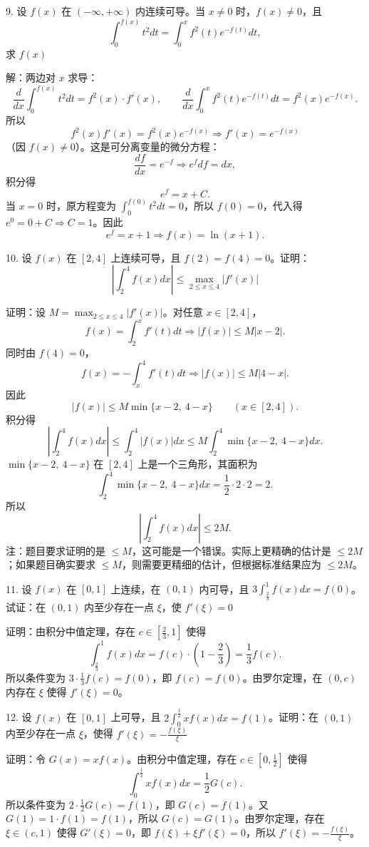9. 设 \(f(x)\) 在 \((-\infty,+\infty)\) 内连续可导。当 \(x\ne0\) 时，\(f(x)\ne0\)，且
\[ \int_{0}^{f(x)}t^{2}dt=\int_{0}^{x}f^{2}(t)e^{-f(t)}dt, \]
求 \(f(x)\)

解：两边对 \(x\) 求导：
\[ \frac{d}{dx}\int_{0}^{f(x)}t^{2}dt=f^{2}(x)\cdot f'(x),\qquad \frac{d}{dx}\int_{0}^{x}f^{2}(t)e^{-f(t)}dt=f^{2}(x)e^{-f(x)}. \]
所以
\[ f^{2}(x)f'(x)=f^{2}(x)e^{-f(x)}\Rightarrow f'(x)=e^{-f(x)} \]
（因 \(f(x)\ne0\)）。这是可分离变量的微分方程：
\[ \frac{df}{dx}=e^{-f}\Rightarrow e^{f}df=dx, \]
积分得
\[ e^{f}=x+C. \]
当 \(x=0\) 时，原方程变为 \(\int_{0}^{f(0)}t^{2}dt=0\)，所以 \(f(0)=0\)，代入得 \(e^{0}=0+C\Rightarrow C=1\)。因此
\[ e^{f}=x+1\Rightarrow f(x)=\ln(x+1). \]

10. 设 \(f(x)\) 在 \([2,4]\) 上连续可导，且 \(f(2)=f(4)=0\)。证明：
\[ \left|\int_{2}^{4}f(x)dx\right|\le\max_{2\le x\le4}|f'(x)| \]

证明：设 \(M=\max_{2\le x\le4}|f'(x)|\)。对任意 \(x\in[2,4]\)，
\[ f(x)=\int_{2}^{x}f'(t)dt\Rightarrow|f(x)|\le M|x-2|. \]
同时由 \(f(4)=0\)，
\[ f(x)=-\int_{x}^{4}f'(t)dt\Rightarrow|f(x)|\le M|4-x|. \]
因此
\[ |f(x)|\le M\min\{x-2,\ 4-x\}\qquad(x\in[2,4]). \]
积分得
\[ \left|\int_{2}^{4}f(x)dx\right|\le\int_{2}^{4}|f(x)|dx\le M\int_{2}^{4}\min\{x-2,\ 4-x\}dx. \]
\(\min\{x-2,\ 4-x\}\) 在 \([2,4]\) 上是一个三角形，其面积为
\[ \int_{2}^{4}\min\{x-2,\ 4-x\}dx=\frac{1}{2}\cdot2\cdot2=2. \]
所以
\[ \left|\int_{2}^{4}f(x)dx\right|\le2M. \]
注：题目要求证明的是 \(\le M\)，这可能是一个错误。实际上更精确的估计是 \(\le2M\)；如果题目确实要求 \(\le M\)，则需要更精细的估计，但根据标准结果应为 \(\le2M\)。

11. 设 \(f(x)\) 在 \([0,1]\) 上连续，在 \((0,1)\) 内可导，且 \(3\int_{\frac{2}{3}}^{1}f(x)dx=f(0)\)。试证：在 \((0,1)\) 内至少存在一点 \(\xi\)，使 \(f'(\xi)=0\)

证明：由积分中值定理，存在 \(c\in\left[\frac{2}{3},1\right]\) 使得
\[ \int_{\frac{2}{3}}^{1}f(x)dx=f(c)\cdot\left(1-\frac{2}{3}\right)=\frac{1}{3}f(c). \]
所以条件变为 \(3\cdot\frac{1}{3}f(c)=f(0)\)，即 \(f(c)=f(0)\)。由罗尔定理，在 \((0,c)\) 内存在 \(\xi\) 使得 \(f'(\xi)=0\)。

12. 设 \(f(x)\) 在 \([0,1]\) 上可导，且 \(2\int_{0}^{\frac{1}{2}}xf(x)dx=f(1)\)。证明：在 \((0,1)\) 内至少存在一点 \(\xi\)，使得 \(f'(\xi)=-\frac{f(\xi)}{\xi}\)

证明：令 \(G(x)=xf(x)\)。由积分中值定理，存在 \(c\in\left[0,\frac{1}{2}\right]\) 使得
\[ \int_{0}^{\frac{1}{2}}xf(x)dx=\frac{1}{2}G(c). \]
所以条件变为 \(2\cdot\frac{1}{2}G(c)=f(1)\)，即 \(G(c)=f(1)\)。又 \(G(1)=1\cdot f(1)=f(1)\)，所以 \(G(c)=G(1)\)。由罗尔定理，存在 \(\xi\in(c,1)\) 使得 \(G'(\xi)=0\)，即 \(f(\xi)+\xi f'(\xi)=0\)，所以 \(f'(\xi)=-\frac{f(\xi)}{\xi}\)。


